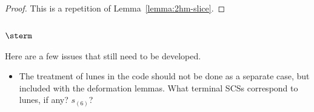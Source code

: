 \begin{proof}  This is a repetition of Lemma~\ref{lemma:2hm-slice}.
\end{proof}


\subsection{$\sterm$}


Here are a few issues that still need to be developed.
\begin{itemize}
\item The treatment of lunes in the code should not be done
as a separate case, but included with the deformation lemmas.
What terminal SCSs correspond to lunes, if any?  $s_{(6)}$?
\end{itemize}
